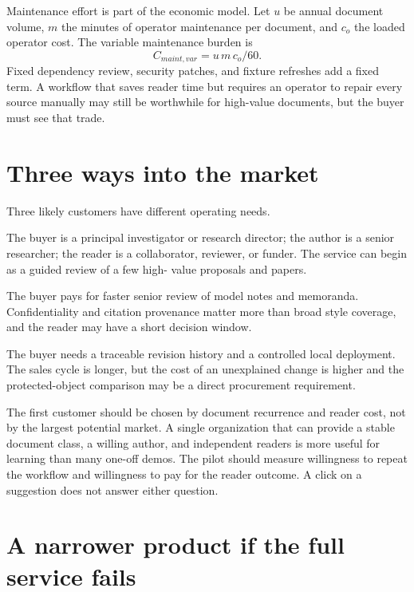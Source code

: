 Maintenance effort is part of the economic model. Let $u$ be annual document
volume, $m$ the minutes of operator maintenance per document, and $c_o$ the
loaded operator cost. The variable maintenance burden is
\begin{equation}
  C_{maint,var}=u\,m\,c_o/60.
  \label{eq:ops-maintenance}
\end{equation}
Fixed dependency review, security patches, and fixture refreshes add a fixed
term. A workflow that saves reader time but requires an operator to repair
every source manually may still be worthwhile for high-value documents, but
the buyer must see that trade.

\section{Three ways into the market}
\label{sec:ops-market}

Three likely customers have different operating needs.

\begin{description}[style=nextline,leftmargin=34mm,labelindent=0mm]
\item[Research groups] The buyer is a principal investigator or research
director; the author is a senior researcher; the reader is a collaborator,
reviewer, or funder. The service can begin as a guided review of a few high-
value proposals and papers.
\item[Investment and policy teams] The buyer pays for faster senior review of
model notes and memoranda. Confidentiality and citation provenance matter more
than broad style coverage, and the reader may have a short decision window.
\item[Regulated technical operations] The buyer needs a traceable revision
history and a controlled local deployment. The sales cycle is longer, but the
cost of an unexplained change is higher and the protected-object comparison may
be a direct procurement requirement.
\end{description}

The first customer should be chosen by document recurrence and reader cost, not
by the largest potential market. A single organization that can provide a
stable document class, a willing author, and independent readers is more useful
for learning than many one-off demos. The pilot should measure willingness to
repeat the workflow and willingness to pay for the reader outcome. A click on a
suggestion does not answer either question.

\section{A narrower product if the full service fails}
\label{sec:ops-alternatives}

